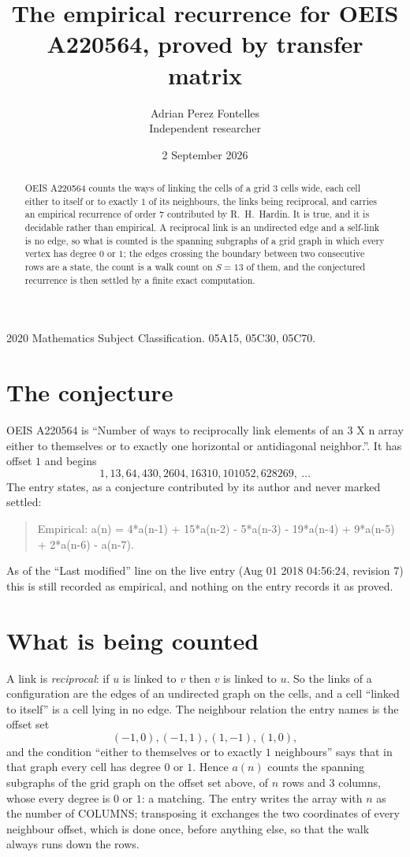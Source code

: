 \documentclass[11pt,a4paper]{article}
\title{The empirical recurrence for OEIS A220564, proved by transfer matrix}
\author{Adrian Perez Fontelles\\ \small Independent researcher}
\date{2 September 2026}
\theoremstyle{plain}
\theoremstyle{definition}
\begin{document}
\maketitle

\begin{abstract}
OEIS A220564 counts the ways of linking the cells of a grid $3$ cells wide, each cell either to
itself or to exactly $1$ of its neighbours, the links being reciprocal, and carries an
empirical recurrence of order $7$ contributed by R.~H.~Hardin. It is true, and it is
decidable rather than empirical. A reciprocal link is an undirected edge and a self-link is
no edge, so what is counted is the spanning subgraphs of a grid graph in which every vertex
has degree $0$ or $1$; the edges crossing the boundary between two consecutive rows are a
state, the count is a walk count on $S=13$ of them, and the conjectured recurrence is then
settled by a finite exact computation.
\end{abstract}

\noindent\small 2020 Mathematics Subject Classification. 05A15, 05C30, 05C70.\normalsize

\section{The conjecture}

OEIS A220564 is ``Number of ways to reciprocally link elements of an 3 X n array either to themselves or to exactly one horizontal or antidiagonal neighbor.''. It has offset $1$ and begins
\[
1, 13, 64, 430, 2604, 16310, 101052, 628269,\ \dots
\]
The entry states, as a conjecture contributed by its author and never marked settled:
\begin{quote}
Empirical: a(n) = 4*a(n-1) + 15*a(n-2) - 5*a(n-3) - 19*a(n-4) + 9*a(n-5) + 2*a(n-6) - a(n-7).
\end{quote}
As of the ``Last modified'' line on the live entry (Aug 01 2018 04:56:24, revision 7) this is still
recorded as empirical, and nothing on the entry records it as proved.

\section{What is being counted}

A link is \emph{reciprocal}: if $u$ is linked to $v$ then $v$ is linked to $u$. So the links
of a configuration are the edges of an undirected graph on the cells, and a cell ``linked to
itself'' is a cell lying in no edge. The neighbour relation the entry names is the offset set
\[
(-1,0), (-1,1), (1,-1), (1,0),
\]
and the condition ``either to themselves or to exactly $1$ neighbours'' says that in that
graph every cell has degree $0$ or $1$. Hence $a(n)$ counts the spanning subgraphs of the
grid graph on the offset set above, of $n$ rows and $3$ columns,
whose every degree is $0$ or $1$: a matching. The entry writes the array with $n$ as the number of COLUMNS; transposing it exchanges the two coordinates of every neighbour offset, which is done once, before anything else, so that the walk always runs down the rows.
\end{document}
